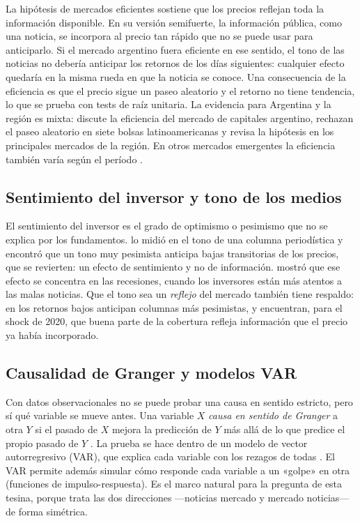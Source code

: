La hipótesis de mercados eficientes \citep{fama1970} sostiene que los precios reflejan toda
la información disponible. En su versión semifuerte, la información pública, como una
noticia, se incorpora al precio tan rápido que no se puede usar para anticiparlo. Si el
mercado argentino fuera eficiente en ese sentido, el tono de las noticias no debería anticipar
los retornos de los días siguientes: cualquier efecto quedaría en la misma rueda en que la
noticia se conoce. Una consecuencia de la eficiencia es que el precio sigue un paseo aleatorio
y el retorno no tiene tendencia, lo que se prueba con tests de raíz unitaria. La evidencia
para Argentina y la región es mixta: \citet{zablotsky2002} discute la eficiencia del mercado
de capitales argentino, \citet{worthington2003} rechazan el paseo aleatorio en siete bolsas
latinoamericanas y \citet{medina2013} revisa la hipótesis en los principales mercados de la
región. En otros mercados emergentes la eficiencia también varía según el período
\citep{jain2020,malafeyev2017,kulikova2024,rochafilho2019}.

\subsection{Sentimiento del inversor y tono de los medios}

El sentimiento del inversor es el grado de optimismo o pesimismo que no se explica por los
fundamentos. \citet{tetlock2007} lo midió en el tono de una columna periodística y encontró
que un tono muy pesimista anticipa bajas transitorias de los precios, que se revierten: un
efecto de sentimiento y no de información. \citet{garcia2013} mostró que ese efecto se
concentra en las recesiones, cuando los inversores están más atentos a las malas noticias.
Que el tono sea un \textit{reflejo} del mercado también tiene respaldo: en
\citet{tetlock2007} los retornos bajos anticipan columnas más pesimistas, y \citet{verma2026}
encuentran, para el shock de 2020, que buena parte de la cobertura refleja información que el
precio ya había incorporado.

\subsection{Causalidad de Granger y modelos VAR}

Con datos observacionales no se puede probar una causa en sentido estricto, pero sí qué
variable se mueve antes. Una variable $X$ \textit{causa en sentido de Granger} a otra $Y$ si
el pasado de $X$ mejora la predicción de $Y$ más allá de lo que predice el propio pasado de
$Y$ \citep{granger1969}. La prueba se hace dentro de un modelo de vector autorregresivo (VAR),
que explica cada variable con los rezagos de todas \citep{sims1980,lutkepohl2005}. El VAR
permite además simular cómo responde cada variable a un «golpe» en otra (funciones de
impulso-respuesta). Es el marco natural para la pregunta de esta tesina, porque trata las dos
direcciones —noticias \flecha{} mercado y mercado \flecha{} noticias— de forma simétrica.

